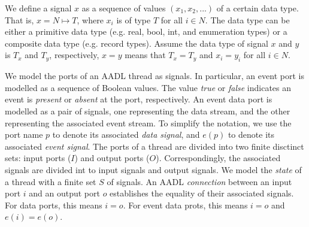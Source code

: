 
We define a signal $x$ as a sequence of values $(x_1, x_2, ...)$ of a certain data type. That is, $x = N \mapsto T$, where $x_i$ is of type $T$ for all $i \in N$. The data type can be either a primitive data type (e.g. real, bool, int, and enumeration types) or a composite data type (e.g. record types). Assume the data type of signal $x$ and $y$ is $T_x$ and $T_y$, respectively, $x = y$ means that $T_x=T_y$ and $x_i = y_i$ for all $i \in N$. 

We model the ports of an AADL thread as signals. In particular, an event port is modelled as a sequence of Boolean values. The value \emph{true} or \emph{false} indicates an event is \emph{present} or \emph{absent} at the port, respectively. An event data port is modelled as a pair of signals, one representing the data stream, and the other representing the associated event stream. To simplify the notation, we use the port name $p$ to denote its associated \emph{data signal}, and $e(p)$ to denote its associated \emph{event signal}. The ports of a thread are divided into two finite disctinct sets: input ports ($I$) and output ports ($O$). Correspondingly, the associated signals are divided int to input signals and output signals. We model the \emph{state} of a thread with a finite set $S$ of signals. %
An AADL \emph{connection} between an input port $i$ and an output port $o$ establishes the equality of their associated signals. For data ports, this means $i = o$. For event data prots, this means $i = o$ and $e(i) = e(o)$. %

